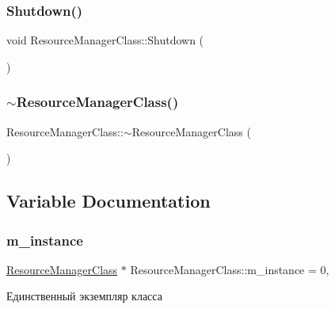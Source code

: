 \subsubsection{\texorpdfstring{Shutdown()}{Shutdown()}}
{\footnotesize\ttfamily void Resource\+Manager\+Class\+::\+Shutdown (\begin{DoxyParamCaption}{ }\end{DoxyParamCaption})}

\mbox{\label{group___resource_managment_gad5e62785d102310401ea8468f962edb7}} 
\subsubsection{\texorpdfstring{$\sim$\+Resource\+Manager\+Class()}{~ResourceManagerClass()}}
{\footnotesize\ttfamily Resource\+Manager\+Class\+::$\sim$\+Resource\+Manager\+Class (\begin{DoxyParamCaption}{ }\end{DoxyParamCaption})\hspace{0.3cm}{\ttfamily [private]}}



\subsection{Variable Documentation}
\mbox{\label{group___resource_managment_ga1e74a4a5bc44d36ec144f2d623ef9ac9}} 
\subsubsection{\texorpdfstring{m\+\_\+instance}{m\_instance}}
{\footnotesize\ttfamily \hyperlink{class_resource_manager_class}{Resource\+Manager\+Class} $\ast$ Resource\+Manager\+Class\+::m\+\_\+instance = 0\hspace{0.3cm}{\ttfamily [static]}, {\ttfamily [private]}}



Единственный экземпляр класса 

